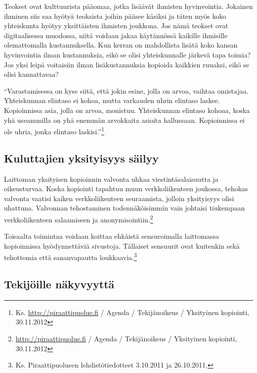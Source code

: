 \documentclass[titlepage,12pt]{article}
\begin{document}


Teokset ovat kulttuurista pääomaa, jotka lisäävät ihmisten
hyvinvointia.  Jokainen ihminen siis saa hyötyä teoksista joihin
pääsee käsiksi ja täten myös koko yhteiskunta hyötyy yksittäisten
ihmisten joukkona.  Jos nämä teokset ovat digitaalisessa muodossa,
niitä voidaan jakaa käytännössä kaikille ihmisille olemattomalla
kustannuksella.  Kun kerran on mahdollista lisätä koko kansan
hyvinvointia ilman kustannuksia, eikö se olisi yhteiskunnalle järkevä
tapa toimia?  Jos yksi leipä voitaisiin ilman lisäkustannuksia
kopioida kaikkien ruuaksi, eikö se olisi kannattavaa?

``Varastamisessa on kyse siitä, että jokin esine, jolla on arvoa,
vaihtaa omistajaa.  Yhteiskunnan elintaso ei kohoa, mutta varkauden
uhrin elintaso laskee. Kopioinnissa asia, jolla on arvoa, monistuu.
Yhteiskunnan elintaso kohoaa, koska yhä useammilla on yhä enemmän
arvokkaita asioita hallussaan.  Kopioinnissa ei ole uhria, jonka
elintaso laskisi.''\footnote{Ks. \url{http://piraattipuolue.fi} /
  Agenda / Tekijänoikeus / Yksityinen kopiointi, 30.11.2012}

\subsection{Kuluttajien yksityisyys säilyy}

Laittoman yksityisen kopioinnin valvonta uhkaa viestintäsalaisuutta ja
oikeusturvaa.  Koska kopiointi tapahtuu muun verkkoliikenteen
joukossa, tehokas valvonta vaatisi kaiken verkkoliikenteen
seuraamista, jolloin yksityisyys olisi uhattuna.  Valvonnan
tehostaminen todennäköisimmin vain johtaisi tiukempaan
verkkoliikenteen salaamiseen ja
anonymisointiin.\footnote{\url{http://piraattipuolue.fi} / Agenda /
  Tekijänoikeus / Yksityinen kopiointi, 30.11.2012} 

Toisaalta toimintaa voidaan koittaa ehkäistä sensuroimalla laittomassa
kopioinnissa hyödynnettäviä sivustoja. %
Tällaiset sensuurit ovat kuitenkin sekä tehottomia että sananvapautta
loukkaavia.\footnote{Ks. Piraattipuolueen lehdistötiedotteet 3.10.2011
  ja 26.10.2011.}

\subsection{Tekijöille näkyvyyttä}
\end{document}
